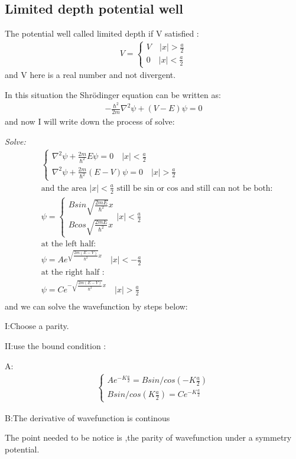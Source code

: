 \documentclass{article}
\begin{document}
\subsection{Limited depth potential well}
The potential well called limited depth if V satisfied :
\begin{align}
  V=\begin{cases}
      V\quad|x|>\frac a2 \\
      0\quad|x|<\frac a2
  \end{cases}
\end{align}
and V here is a real number and not divergent.

In this situation the Shr\"odinger equation can be written as:
\begin{align}
  -\frac{\hbar^2}{2m}\nabla^2\psi+(V-E)\psi=0
\end{align}
and now I will write down the process of solve:

\textit{Solve:}
\begin{align*}
&\begin{cases}
  \nabla^2 \psi+\frac{2m}{\hbar^2}E\psi=0 \quad|x|<\frac a2\\ 
  \nabla^2 \psi+\frac{2m}{\hbar^2}(E-V)\psi=0 \quad|x|>\frac a2
\end{cases}\\
&\text{and the area $|x|<\frac a2$ still be sin or cos and still can not be both:}\\
&\psi=\begin{cases}
  Bsin\sqrt{\frac{2mE}{\hbar^2}}x\\
Bcos\sqrt{\frac{2mE}{\hbar^2}}x
\end{cases}|x|<\frac a2 \\
&\text{at the left half:}\\
&\psi=Ae^{\sqrt{\frac{2m(E-V)}{\hbar^2}}x}\quad|x|<-\frac a2\\
&\text{at the right half :}\\
&\psi=Ce^{-\sqrt{\frac{2m(E-V)}{\hbar^2}}x}\quad|x|>\frac a2\\
\end{align*}
and we can solve the wavefunction by steps below:
\begin{center}
I:Choose a parity.

II:use the bound condition :

A:\begin{align*}
  \begin{cases} Ae^{-K\frac a2 }=Bsin/cos(-K\frac a2)\\
    Bsin/cos(K\frac a2)=Ce^{-K\frac a2}
  \end{cases}
\end{align*}

B:The derivative of wavefunction is continous
\end{center}
The point needed to be notice is ,the parity of wavefunction under a symmetry potential.
\end{document}
